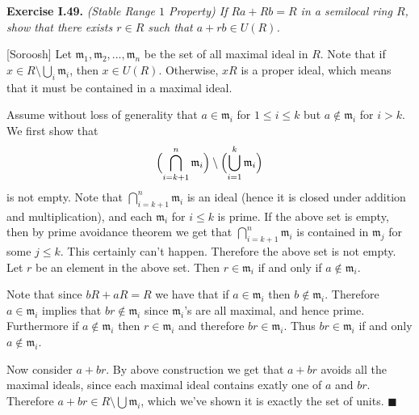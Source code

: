 \documentclass{article}
\makeatletter
\newcommand\<{\triangleleft}
\newcommand{\m}{\ensuremath{\mathfrak{m}}}
\newenvironment{exercise}[1]{\gdef\currentEx{#1}\begin{trivlist}\item[]%
                \textbf{Exercise #1.} \it}{\end{trivlist}}
\newenvironment{solution}[1]{\def\x{#1}\begin{trivlist}\item[]\hspace*{-.5em}[\x]}
                {\hspace*{\fill} $\blacksquare$
                \protected@write0{}{\currentEx, \x}
                \end{trivlist}}
\makeatother
\begin{document}
 \begin{exercise}{I.49}
    (Stable Range $1$ Property) If $Ra+Rb=R$ in a semilocal ring $R$,
    show that there exists $r \in R$ such that $a+rb \in U(R)$.
 \end{exercise}
 \begin{solution}{Soroosh}
    Let $\m_1, \m_2,...,\m_n$ be the set of all maximal ideal in $R$.
    Note that if $x \in R \setminus \bigcup_{i} \m_i$, then $x \in U(R)$.
    Otherwise, $xR$ is a proper ideal, which means that it must be
    contained in a maximal ideal.

    Assume without loss of generality that $a \in \m_i$ for
    $1 \leq i \leq k$ but $a \not \in \m_i$ for $i>k$. We first
    show that
    \[\Bigl( \bigcap_{i=k+1}^n \m_i \Bigr) \setminus \Bigl( \bigcup_{i=1}^k \m_i \Bigr)\]
    is not empty. Note that $\bigcap_{i=k+1}^n \m_i$ is an ideal
    (hence it is closed
    under addition and multiplication), and each $\m_i$ for $i \leq k$ is
    prime. If the above set is empty, then by prime avoidance theorem
    we get that $\bigcap_{i=k+1}^n \m_i$ is contained in $\m_j$ for
    some $j \leq k$. This certainly can't happen. Therefore the above set
    is not empty. Let $r$ be an element in the above set.
    Then $r \in \m_i$ if and only if $a \not \in \m_i$.

    Note that since $bR+aR=R$ we have that if $a \in \m_i$ then
    $b \not \in \m_i$. Therefore $a \in \m_i$ implies that
    $br \not \in \m_i$ since $\m_i$'s are all maximal, and hence prime.
    Furthermore if $a \not \in \m_i$ then $r \in \m_i$ and therefore
    $br \in \m_i$. Thus $br \in \m_i$ if and only $a \not \in \m_i$.

    Now consider $a+br$. By above construction we get that $a+br$
    avoids all the maximal ideals, since each maximal ideal contains exatly
    one of $a$ and $br$. Therefore $a+br \in R \setminus \bigcup \m_i$,
    which we've shown it is exactly the set of units.
 \end{solution}
\end{document}
